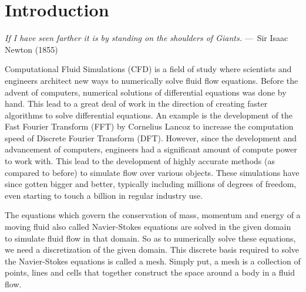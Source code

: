 
\chapter{Introduction}
\label{ch:Introduction}

\begin{epigraph}
    \emph{If I have seen farther it is by standing on the shoulders of
    Giants.} ---~Sir Isaac Newton (1855)
\end{epigraph}

Computational Fluid Simulations (CFD) is a field of study where scientists and engineers architect new ways to numerically solve fluid flow equations. Before the advent of computers, numerical solutions of differential equations was done by hand. This lead to a great deal of work in the direction of creating faster algorithms to solve differential equations. An example is the development of the Fast Fourier Transform (FFT) by Cornelius Lancoz to increase the computation speed of Discrete Fourier Transform (DFT). However, since the development and advancement of computers, engineers had a significant amount of compute power to work with. This lead to the development of highly accurate methods (as compared to before) to simulate flow over various objects. These simulations have since gotten bigger and better, typically including millions of degrees of freedom, even starting to touch a billion in regular industry use.

The equations which govern the conservation of mass, momentum and energy of a moving fluid also called Navier-Stokes equations are solved in the given domain to simulate fluid flow in that domain. So as to numerically solve these equations, we need a discretization of the given domain. This discrete basis required to solve the Navier-Stokes equations is called a mesh. Simply put, a mesh is a collection of points, lines and cells that together construct the space around a body in a fluid flow.



